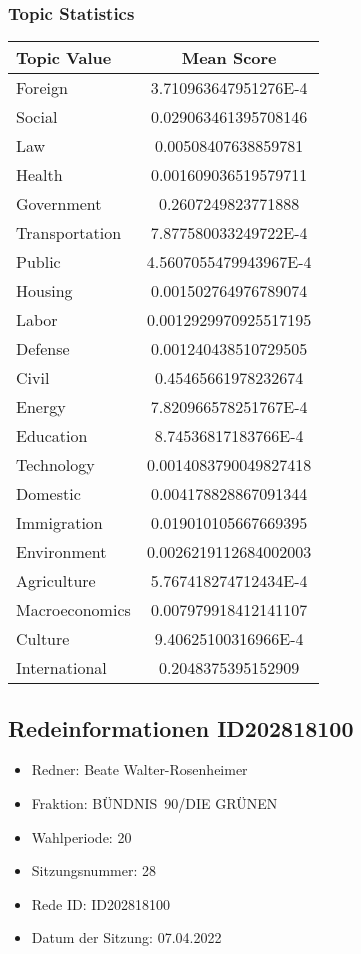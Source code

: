 \documentclass{article}
\begin{document}
\subsubsection*{Topic Statistics}
\begin{tabular}{|l|c|}
\hline
\textbf{Topic Value} & \textbf{Mean Score} \\
\hline
Foreign & 3.710963647951276E-4 \\
\hline
Social & 0.029063461395708146 \\
\hline
Law & 0.00508407638859781 \\
\hline
Health & 0.001609036519579711 \\
\hline
Government & 0.2607249823771888 \\
\hline
Transportation & 7.877580033249722E-4 \\
\hline
Public & 4.5607055479943967E-4 \\
\hline
Housing & 0.001502764976789074 \\
\hline
Labor & 0.0012929970925517195 \\
\hline
Defense & 0.001240438510729505 \\
\hline
Civil & 0.45465661978232674 \\
\hline
Energy & 7.820966578251767E-4 \\
\hline
Education & 8.74536817183766E-4 \\
\hline
Technology & 0.0014083790049827418 \\
\hline
Domestic & 0.004178828867091344 \\
\hline
Immigration & 0.019010105667669395 \\
\hline
Environment & 0.0026219112684002003 \\
\hline
Agriculture & 5.767418274712434E-4 \\
\hline
Macroeconomics & 0.007979918412141107 \\
\hline
Culture & 9.40625100316966E-4 \\
\hline
International & 0.2048375395152909 \\
\hline
\end{tabular}
\subsection{Redeinformationen ID202818100}
\begin{itemize}
\item Redner: Beate Walter-Rosenheimer
\item Fraktion: BÜNDNIS 90/DIE GRÜNEN
\item Wahlperiode: 20
\item Sitzungsnummer: 28
\item Rede ID: ID202818100
\item Datum der Sitzung: 07.04.2022
\end{itemize}
\end{document}
